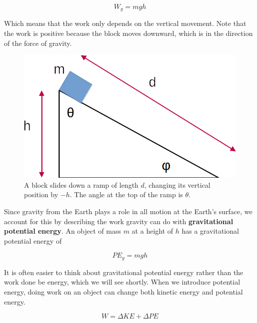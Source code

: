 \documentclass[12pt]{book}
\begin{document}
\begin{equation}
W_g = mgh
\end{equation}

Which means that the work only depends on the vertical movement. Note that the work is positive because the block moves downward, which is in the direction of the force of gravity.

\begin{figure}[t]
\centering
\includegraphics[scale=0.3]{gravity_ramp.png}
\caption{A block slides down a ramp of length $d$, changing its vertical position by $-h$. The angle at the top of the ramp is $\theta$.}
\label{gravramp}
\end{figure}

Since gravity from the Earth plays a role in all motion at the Earth's surface, we account for this by describing the work gravity can do with \textbf{gravitational potential energy}. An object of mass $m$ at a height of $h$ has a gravitational potential energy of

\begin{equation}
PE_g = mgh
\end{equation}

It is often easier to think about gravitational potential energy rather than the work done be energy, which we will see shortly. When we introduce potential energy, doing work on an object can change both kinetic energy and potential energy.

\begin{equation}
W = \Delta KE + \Delta PE
\end{equation}
\end{document}
